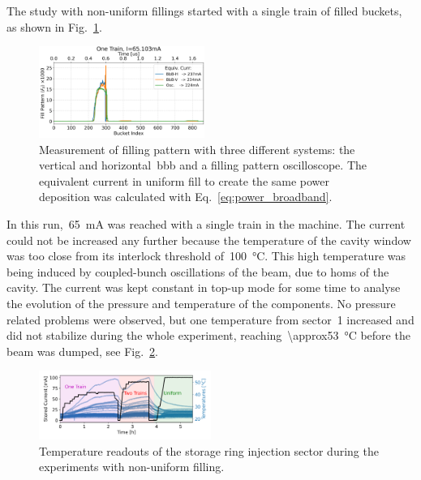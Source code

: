 \documentclass
[
    a4paper,
]{jacow}
\begin{document}
    The study with non-uniform fillings started with a single train of filled buckets, as shown in Fig.~\ref{fig:2023-08-01_onetrain_fill}.
    \begin{figure}
        \centering
        \includegraphics[width=0.48\textwidth]{THPC44_f1.png}
        \caption{Measurement of filling pattern with three different systems: the vertical and horizontal~\gls{bbb} and a filling pattern oscilloscope. The equivalent current in uniform fill to create the same power deposition was calculated with Eq.~\eqref{eq:power_broadband}.}
        \label{fig:2023-08-01_onetrain_fill}
    \end{figure}
    In this run,~\SI{65}{\milli\ampere} was reached with a single train in the machine. The current could not be increased any further because the temperature of the cavity window was too close from its interlock threshold of~\SI{100}{\celsius}. This high temperature was being induced by coupled-bunch oscillations of the beam, due to \glspl{hom} of the cavity. The current was kept constant in top-up mode for some time to analyse the evolution of the pressure and temperature of the components. No pressure related problems were observed, but one temperature from sector~\num{1} increased and did not stabilize during the whole experiment, reaching~\SI{\approx53}{\celsius} before the beam was dumped, see Fig.~\ref{fig:temps_sector1}.
        \begin{figure}
        \centering
        \includegraphics[width=0.5\textwidth]{THPC44_f2.png}
        \caption{Temperature readouts of the storage ring injection sector during the experiments with non-uniform filling.}
        \label{fig:temps_sector1}
    \end{figure}
\end{document}
